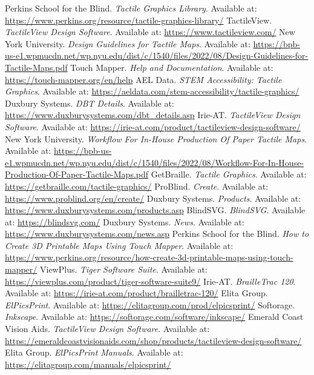 \begin{thebibliography}{99}

 Perkins School for the Blind. \textit{Tactile Graphics Library}. Available at: \url{https://www.perkins.org/resource/tactile-graphics-library/}
 TactileView. \textit{TactileView Design Software}. Available at: \url{https://www.tactileview.com/}
 New York University. \textit{Design Guidelines for Tactile Maps}. Available at: \url{https://bpb-us-e1.wpmucdn.net/wp.nyu.edu/dist/c/1540/files/2022/08/Design-Guidelines-for-Tactile-Maps.pdf}
 Touch Mapper. \textit{Help and Documentation}. Available at: \url{https://touch-mapper.org/en/help}
 AEL Data. \textit{STEM Accessibility: Tactile Graphics}. Available at: \url{https://aeldata.com/stem-accessibility/tactile-graphics/}
 Duxbury Systems. \textit{DBT Details}. Available at: \url{https://www.duxburysystems.com/dbt_details.asp}
 Irie-AT. \textit{TactileView Design Software}. Available at: \url{https://irie-at.com/product/tactileview-design-software/}
 New York University. \textit{Workflow For In-House Production Of Paper Tactile Maps}. Available at: \url{https://bpb-us-e1.wpmucdn.net/wp.nyu.edu/dist/c/1540/files/2022/08/Workflow-For-In-House-Production-Of-Paper-Tactile-Maps.pdf}
 GetBraille. \textit{Tactile Graphics}. Available at: \url{https://getbraille.com/tactile-graphics/}
 ProBlind. \textit{Create}. Available at: \url{https://www.problind.org/en/create/}
 Duxbury Systems. \textit{Products}. Available at: \url{https://www.duxburysystems.com/products.asp}
 BlindSVG. \textit{BlindSVG}. Available at: \url{https://blindsvg.com/}
 Duxbury Systems. \textit{News}. Available at: \url{https://www.duxburysystems.com/news.asp}
 Perkins School for the Blind. \textit{How to Create 3D Printable Maps Using Touch Mapper}. Available at: \url{https://www.perkins.org/resource/how-create-3d-printable-maps-using-touch-mapper/}
 ViewPlus. \textit{Tiger Software Suite}. Available at: \url{https://viewplus.com/product/tiger-software-suite9/}
 Irie-AT. \textit{BrailleTrac 120}. Available at: \url{https://irie-at.com/product/brailletrac-120/}
 Elita Group. \textit{ElPicsPrint}. Available at: \url{https://elitagroup.com/prod/elpicsprint/}
 Softorage. \textit{Inkscape}. Available at: \url{https://softorage.com/software/inkscape/}
 Emerald Coast Vision Aids. \textit{TactileView Design Software}. Available at: \url{https://emeraldcoastvisionaids.com/shop/products/tactileview-design-software/}
 Elita Group. \textit{ElPicsPrint Manuals}. Available at: \url{https://elitagroup.com/manuals/elpicsprint/}


\end{thebibliography}
